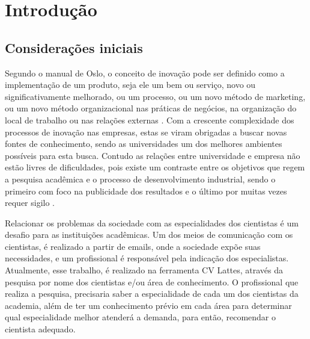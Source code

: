 \chapter{Introdução}\label{cap:introducao}


\section{Considerações iniciais}\label{sec:consideracoesIniciais}

Segundo o manual de Oslo, o conceito de inovação pode ser definido como a implementação de um produto, seja ele um bem ou serviço, novo ou significativamente melhorado, ou um processo, ou um novo método de marketing, ou um novo método organizacional nas práticas de negócios, na organização do local de trabalho ou nas relações externas \cite{ManualOslo:1997}. Com a crescente complexidade dos processos de inovação nas empresas, estas se viram obrigadas a buscar novas fontes de conhecimento, sendo as universidades um dos melhores ambientes possíveis para esta busca. Contudo as relações entre universidade e empresa não estão livres de dificuldades, pois existe um contraste entre os objetivos que regem a pesquisa acadêmica e o processo de desenvolvimento industrial, sendo o primeiro com foco na publicidade dos resultados e o último por muitas vezes requer sigilo \cite{UnicampIE}.

Relacionar os problemas da sociedade com as especialidades dos cientistas é um desafio para as instituições acadêmicas. Um dos meios de comunicação com os cientistas, é realizado a partir de emails, onde a sociedade expõe suas necessidades, e um profissional é responsável pela indicação dos especialistas. Atualmente, esse trabalho, é realizado na ferramenta CV Lattes, através da pesquisa por nome dos cientistas e/ou área de conhecimento. O profissional que realiza a pesquisa, precisaria saber a especialidade de cada um dos cientistas da academia, além de ter um conhecimento prévio em cada área para determinar qual especialidade melhor atenderá a demanda, para então, recomendar o cientista adequado.

